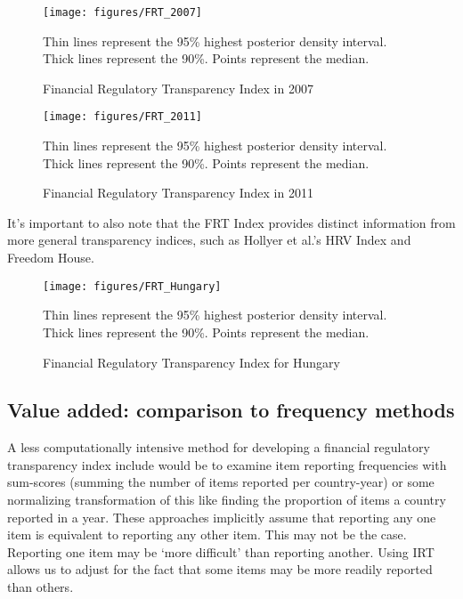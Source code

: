 \documentclass[a4paper]{article}
\begin{document}
\begin{figure}
    \caption{Financial Regulatory Transparency Index in 2007}
    \label{FRT_2007}
    \begin{center}
        \texttt{[image: figures/FRT\_2007]}
    \end{center}
    {\scriptsize{Thin lines represent the 95\% highest posterior density interval. Thick lines represent the 90\%. Points represent the median.}}
\end{figure}

\begin{figure}
    \caption{Financial Regulatory Transparency Index in 2011}
    \label{FRT_2011}
    \begin{center}
        \texttt{[image: figures/FRT\_2011]}
    \end{center}
    {\scriptsize{Thin lines represent the 95\% highest posterior density interval. Thick lines represent the 90\%. Points represent the median.}}
\end{figure}

It's important to also note that the FRT Index provides distinct information from more general transparency indices, such as Hollyer et al.'s HRV Index and Freedom House.   


\begin{figure}
    \caption{Financial Regulatory Transparency Index for Hungary}
    \label{FRTHungary}
    \begin{center}
        \texttt{[image: figures/FRT\_Hungary]}
    \end{center}
    {\scriptsize{Thin lines represent the 95\% highest posterior density interval. Thick lines represent the 90\%. Points represent the median.}}
\end{figure}

\subsection{Value added: comparison to frequency methods}

A less computationally intensive method for developing a financial regulatory transparency index include would be to examine item reporting frequencies with sum-scores (summing the number of items reported per country-year) or some normalizing transformation of this like finding the proportion of items a country reported in a year. These approaches implicitly assume that reporting any one item is equivalent to reporting any other item. This may not be the case. Reporting one item may be `more difficult' than reporting another. Using IRT allows us to adjust for the fact that some items may be more readily reported than others. 
\end{document}
